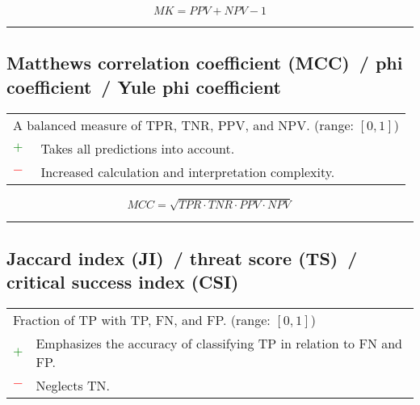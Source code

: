 \documentclass{article}
\begin{document}
\begin{equation}
	\textit{MK} = \textit{PPV} + \textit{NPV} - 1
%
	\label{equation:MK}
\end{equation}

\hrule


\subsection[Matthews correlation coefficient (MCC)~/ phi coefficient~/ Yule phi coefficient]{Matthews correlation coefficient (MCC)~/ phi coefficient~/ Yule phi coefficient \cite{yule1912methods, matthews1975comparison, cramer1999mathematical}}

\begin{table}[H]\centering
	\begin{tabular}{m{}m{}}
		\multicolumn{2}{m{0.95\textwidth}}{A balanced measure of TPR, TNR, PPV, and NPV. (range: $[0, 1]$)} \\
		\textcolor{Green}{$+$} & Takes all predictions into account. \\
		\textcolor{Red}{$-$}   & Increased calculation and interpretation complexity.
	\end{tabular}
\end{table}

\begin{equation}
	\textit{MCC} = \sqrt{\textit{TPR} \cdot \textit{TNR} \cdot \textit{PPV} \cdot \textit{NPV}}
%
	\label{equation:MCC}
\end{equation}

\hrule


\subsection[Jaccard index (JI)~/ threat score (TS)~/ critical success index (CSI)]{Jaccard index (JI)~/ threat score (TS)~/ critical success index (CSI) \cite{jaccard1912distribution, murphy1996finley}}

\begin{table}[H]\centering
	\begin{tabular}{m{}m{}}
		\multicolumn{2}{m{0.95\textwidth}}{Fraction of TP with TP, FN, and FP. (range: $[0, 1]$)} \\
		\textcolor{Green}{$+$} & Emphasizes the accuracy of classifying TP in relation to FN and FP. \\
		\textcolor{Red}{$-$}   & Neglects TN.
	\end{tabular}
\end{table}
\end{document}
